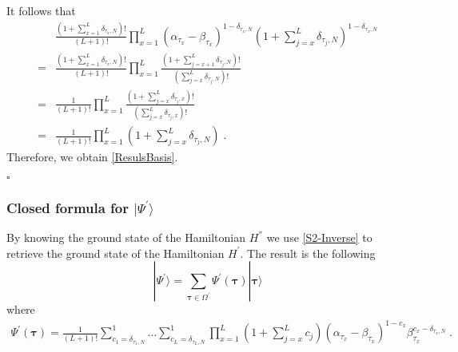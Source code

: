 \documentclass[10pt]{article}
\numberwithin{equation}{section}
\numberwithin{equation}{subsection}
\newcommand{\dt}{\;.}
\begin{document}
It follows that 
\begin{align}\label{remove-exponent}
&\frac{(1+\sum_{x=1}^{L}\delta_{\tau_{x},N})!}{(L+1)!}\prod_{x=1}^{L}\left(\alpha_{\tau_{x}}-\beta_{\tau_{x}}\right)^{1-\delta_{\tau_{x},N}}\left(1+\sum_{j=x}^{L}\delta_{\tau_{j},N}\right)^{1-\delta_{\tau_{x},N}}\nonumber\\
=&\frac{(1+\sum_{x=1}^{L}\delta_{\tau_{x},N})!}{(L+1)!}\prod_{x=1}^{L}\frac{(1+\sum_{j=x+1}^{L}\delta_{\tau_{j},N})!}{(\sum_{j=x}^{L}\delta_{\tau_{j},N})!}\nonumber\\
=&\frac{1}{(L+1)!}\prod_{x=1}^{L}\frac{(1+\sum_{j=x}^{L}\delta_{\tau_{j},x})!}{(\sum_{j=x}^{L}\delta_{\tau_{j},x})!}\nonumber\\
=&\frac{1}{(L+1)!}\prod_{x=1}^{L}\left(1+\sum_{j=x}^{L}\delta_{\tau_{j},N}\right)\dt
\end{align}
Therefore, we obtain \eqref{ResulsBasis}.
\begin{flushright}
	$\square$
\end{flushright} 
\subsubsection{Closed formula for $|\Psi^{'}\rangle$}\label{subsectionSSdual}
By knowing the ground state  of the Hamiltonian $H^{''}$ we use \eqref{S2-Inverse} to retrieve the ground state of the Hamiltonian $H^{'}$. The result is the following 
\begin{equation}\label{ABS-vect}
    |\Psi^{'}\rangle =\sum_{\bm{\tau}\in \Omega^{'}}\Psi^{'}(\bm{\tau})|\bm{\tau}\rangle 
\end{equation}
where  
\begin{equation}\label{ABS}
		\begin{split}
			\Psi^{'}(\bm{\tau})=\frac{1}{(L+1)!}\sum_{c_{1}=\delta_{\tau_{1},N}}^{1}\ldots\sum_{c_{L}=\delta_{\tau_{L},N}}^{1}\prod_{x=1}^{L}\left(1+\sum_{j=x}^{L}c_{j}\right)(\alpha_{\tau_{x}}-\beta_{\tau_{x}})^{1-c_{x}}\beta_{\tau_{x}}^{c_{x}-\delta_{\tau_{x},N}}\dt
		\end{split}
	\end{equation} 
\end{document}
